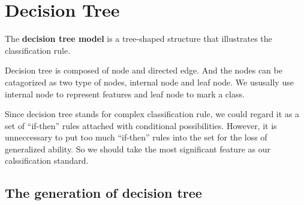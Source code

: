\chapter{Decision Tree}

\begin{define}
    The \textbf{decision tree model} is a tree-shaped structure that illustrates the classification rule. 
\end{define}
Decision tree is composed of node and directed edge. And the nodes can be catagorized as two type of nodes, internal node and leaf node. We ususally use internal node to represent features and leaf node
to mark a class. 

Since decision tree stands for complex classification rule, we could regard it as a set of ``if-then'' rules attached with conditional possibilities. However, it is unneccessary to put too much 
``if-then'' rules into the set for the loss of generalized ability. So we should take the most significant feature as our calssification standard. 

\section{The generation of decision tree}